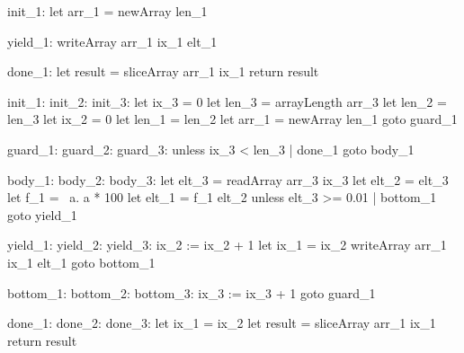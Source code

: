 \documentclass[preamble.tex]{subfiles}
\begin{document}
\begin{loopcode}[%
]
init_1:
  let arr_1 = newArray len_1

yield_1:
  writeArray arr_1 ix_1 elt_1

done_1:
  let result = sliceArray arr_1 ix_1
  return result
\end{loopcode}


\begin{loopcode}[%
]
init_1:
init_2:
init_3:
  let ix_3 = 0
  let len_3 = arrayLength arr_3
  let len_2 = len_3
  let ix_2 = 0
  let len_1 = len_2
  let arr_1 = newArray len_1
  goto guard_1

guard_1:
guard_2:
guard_3:
  unless ix_3 < len_3 | done_1
  goto body_1

body_1:
body_2:
body_3:
  let elt_3 = readArray arr_3 ix_3
  let elt_2 = elt_3
  let f_1 = \ a. a * 100
  let elt_1 = f_1 elt_2
  unless elt_3 >= 0.01 | bottom_1
  goto yield_1

yield_1:
yield_2:
yield_3:
  ix_2 := ix_2 + 1
  let ix_1 = ix_2
  writeArray arr_1 ix_1 elt_1
  goto bottom_1

bottom_1:
bottom_2:
bottom_3:
  ix_3 := ix_3 + 1
  goto guard_1

done_1:
done_2:
done_3:
  let ix_1 = ix_2
  let result = sliceArray arr_1 ix_1
  return result
\end{loopcode}


\end{document}
